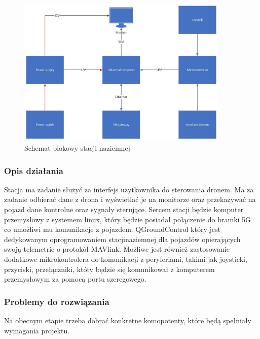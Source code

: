 \documentclass{article}
\begin{document}
\begin{figure}[H]
    \centering
    \includegraphics[width=0.9\textwidth]{stacja.jpg}
    \caption{Schemat blokowy stacji naziemnej}
\end{figure}

\subsubsection{Opis działania}
Stacja ma zadanie służyć za interfejs użytkownika do sterowania dronem.
Ma za zadanie odbierać dane z drona i wyświetlać je na monitorze oraz przekazywać na pojazd dane kontrolne oraz sygnały sterujące.
Sercem stacji będzie komputer przemysłowy z systemem linux, który będzie posiadał połączenie do bramki 5G co umożliwi mu komunikacje z pojazdem. 
QGroundControl który jest dedykowanym oprogramowaniem stacjinaziemnej dla pojazdów opierających swoją telemetrie o protokół MAVlink. Możliwe jest również zastosowanie dodatkowe mikrokontrolera do komunikacji z peryferiami, takimi jak joysticki, przyciski, przełączniki, któty będzie się komunikował z 
komputerem przemysłowym za pomocą portu szeregowego.

\subsubsection{Problemy do rozwiązania}
Na obecnym etapie trzeba dobrać konkretne komopotenty, które będą spełniały wymagania projektu.
\end{document}
